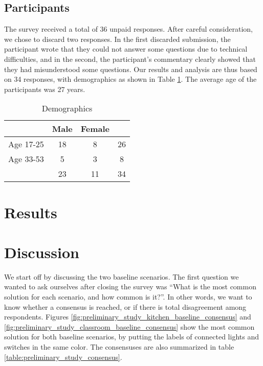     \subsection{Participants} \label{subsec:explor:survey:participants}
    The survey received a total of 36 unpaid responses. After careful consideration, we chose to discard two responses. In the first discarded submission, the participant wrote that they could not answer some questions due to technical difficulties, and in the second, the participant's commentary clearly showed that they had misunderstood some questions. Our results and analysis are thus based on 34 responses, with demographics as shown in Table \ref{table:explor:demographics}. The average age of the participants was 27 years.

        \begin{table}[h!]
        \centering
            \begin{tabular}{|c|c c|c|} 
            \hline
                      & Male & Female &    \\
            \hline
            Age 17-25 &   18 &      8 & 26 \\
            Age 33-53 &    5 &      3 &  8 \\
            \hline
                      &   23 &     11 & 34 \\
            \hline
            \end{tabular}
        \caption{Demographics}
        \label{table:explor:demographics}
        \end{table}

\section{Results} \label{sec:explor:results}

\section{Discussion} \label{sec:explor:discussion}
We start off by discussing the two baseline scenarios. The first question we wanted to ask ourselves after closing the survey was ``What is the most common solution for each scenario, and how common is it?''. In other words, we want to know whether a consensus is reached, or if there is total disagreement among respondents. Figures \ref{fig:preliminary_study_kitchen_baseline_consensus} and \ref{fig:preliminary_study_classroom_baseline_consensus} show the most common solution for both baseline scenarios, by putting the labels of connected lights and switches in the same color. The consensuses are also summarized in table \ref{table:preliminary_study_consensus}.

